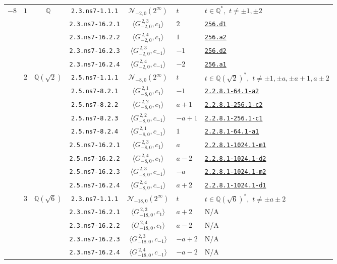 \documentclass[11pt]{amsart}
\newcommand{\eclabel}[1]{\href{https://www.lmfdb.org/EllipticCurve/Q/#1}{\texttt{#1}}}
\newcommand{\ecnflabel}[2]{\href{https://www.lmfdb.org/EllipticCurve/#1-#2}{\texttt{#1-#2}}}
\theoremstyle{definition}
\newcommand{\Q}{\mathbb Q}
\newcommand{\QQ}{\mathbb Q}
\begin{document}
{\begin{longtable}{|c|c|c|c|c|l|l|}
          
  {$-8$} &    {$1$} & {$\QQ$} &  \texttt{2.3.ns7-1.1.1} & $\mathcal N_{-2,0}(2^{\infty})$ &  $t$ &  $t\in \Q^*,\,\, t\ne \pm 1,\pm 2$ \\  \cline{4-7} 
 & & & \texttt{2.3.ns7-16.2.1} & $\langle G^{\, 2,3}_{-2,0},c_{1}\rangle$ &   $2$ &  \eclabel{256.d1} \\  \cline{4-7}   
 & & & \texttt{2.3.ns7-16.2.2} & $\langle G^{\, 2,4}_{-2,0},c_{1}\rangle$ &   $1$ &  \eclabel{256.a2} \\  \cline{4-7}   
 & & & \texttt{2.3.ns7-16.2.3} & $\langle G^{\, 2,3}_{-2,0},c_{-1}\rangle$ &  $-1$ &  \eclabel{256.d2}\\  \cline{4-7}   
 & & & \texttt{2.3.ns7-16.2.4} & $\langle G^{\, 2,4}_{-2,0},c_{-1}\rangle$ & $-2$ &  \eclabel{256.a1} \\    \cline{2-7}
  &{$2$}  &{$\QQ(\sqrt{2 })$} & \texttt{2.5.ns7-1.1.1} & $\mathcal N_{-8,0}(2^{\infty})$ &   $t$  &  $t\in \Q(\sqrt{2})^*,\,\, t\ne \pm 1,\pm a, \pm a + 1, a \pm 2$\\  \cline{4-7} 
 & & & \texttt{2.5.ns7-8.2.1} & $\langle G^{\, 2,1}_{-8,0},c_{1}\rangle$ &   $-1$  &   \ecnflabel{2.2.8.1}{64.1-a2} \\ \cline{4-7}   
 & & & \texttt{2.5.ns7-8.2.2} & $\langle G^{\, 2,2}_{-8,0},c_{1}\rangle$ &   $a+1$ &  \ecnflabel{2.2.8.1}{256.1-c2} \\ \cline{4-7}   
 & & & \texttt{2.5.ns7-8.2.3} & $\langle G^{\, 2,2}_{-8,0},c_{-1}\rangle$ &  $-a+1$  & \ecnflabel{2.2.8.1}{256.1-c1} \\ \cline{4-7}   
 & & & \texttt{2.5.ns7-8.2.4} & $\langle G^{\, 2,1}_{-8,0},c_{-1}\rangle$ &   $1$  &  \ecnflabel{2.2.8.1}{64.1-a1} \\ \cline{4-7} 
 & & & \texttt{2.5.ns7-16.2.1} & $\langle G^{\, 2,3}_{-8,0},c_{1}\rangle$ &   $a$  &  \ecnflabel{2.2.8.1}{1024.1-m1} \\ \cline{4-7}   
 & & & \texttt{2.5.ns7-16.2.2} & $\langle G^{\, 2,4}_{-8,0},c_{1}\rangle$ &   $a-2$ &  \ecnflabel{2.2.8.1}{1024.1-d2} \\ \cline{4-7}   
 & & & \texttt{2.5.ns7-16.2.3} & $\langle G^{\, 2,3}_{-8,0},c_{-1}\rangle$ &  $-a$  &  \ecnflabel{2.2.8.1}{1024.1-m2} \\ \cline{4-7}   
 & & & \texttt{2.5.ns7-16.2.4} & $\langle G^{\, 2,4}_{-8,0},c_{-1}\rangle$ &   $a+2$  &  \ecnflabel{2.2.8.1}{1024.1-d1} \\ \cline{2-7}
  & {$3$}   & {$\QQ(\sqrt{6})$} & \texttt{2.3.ns7-1.1.1} & $\mathcal N_{-18,0}(2^{\infty})$ &   $t$  &  $t\in \Q(\sqrt{6})^*,\,\, t\ne \pm a \pm 2$ \\  \cline{4-7} 
 & & & \texttt{2.3.ns7-16.2.1} & $\langle G^{\, 2,3}_{-18,0},c_{1}\rangle$ &   $a + 2$  &  N/A \\ \cline{4-7}  
 & & & \texttt{2.3.ns7-16.2.2} & $\langle G^{\, 2,4}_{-18,0},c_{1}\rangle$ &   $a - 2$ &   N/A \\ \cline{4-7}  
 & & & \texttt{2.3.ns7-16.2.3} & $\langle G^{\, 2,3}_{-18,0},c_{-1}\rangle$ &  $-a + 2$  & N/A \\ \cline{4-7}  
 & & & \texttt{2.3.ns7-16.2.4} & $\langle G^{\, 2,4}_{-18,0},c_{-1}\rangle$ &   $-a - 2$  &   N/A\\ \hline 


\end{longtable}}
\end{document}
